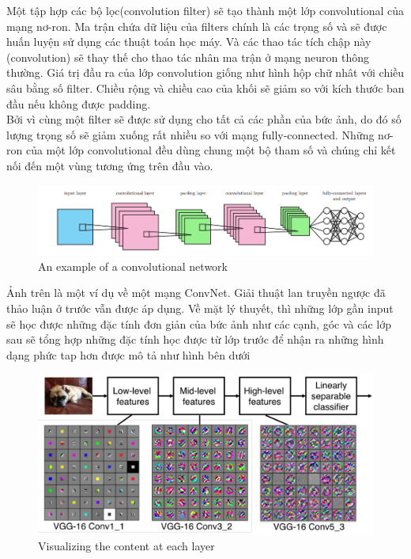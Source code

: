 Một tập hợp các bộ lọc(convolution filter) sẽ tạo thành một lớp convolutional của mạng nơ-ron. Ma trận chứa dữ liệu của filters chính là các trọng số và sẽ được huấn luyện sử dụng các thuật toán học máy. Và các thao tác tích chập này (convolution) sẽ thay thế cho thao tác nhân ma trận ở mạng neuron thông thường. Giá trị đầu ra của lớp convolution giống như hình hộp chữ nhât với chiều sâu bằng số filter. Chiều rộng và chiều cao của khối sẽ giảm so với kích thước ban đầu nếu không được padding.\\

Bởi vì cùng một filter sẽ được sử dụng cho tất cả các phần của bức ảnh, do đó số lượng trọng số sẽ giảm xuống rất nhiều so với mạng fully-connected. Những nơ-ron của một lớp convolutional đều dùng chung một bộ tham số và chúng chỉ kết nối đến một vùng tương ứng trên đầu vào.

\begin{center}
    \begin{figure}[H]
    \begin{center}
     \includegraphics[scale=.5]{image/CNNexample.PNG}
    \end{center}
    \caption{An example of a convolutional network}
    \label{fig:cnn}
    \end{figure}
\end{center}

Ảnh trên là một ví dụ về một mạng ConvNet. Giải thuật lan truyền ngược đã  thảo luận ở trước vẫn được áp dụng. Về mặt lý thuyết, thì những lớp gần input sẽ học được những đặc tính đơn giản của bức ảnh như các cạnh, góc và các lớp sau sẽ tổng hợp những đặc tính học được từ lớp trước để nhận ra những hình dạng phức tap hơn được mô tả như hình bên dưới

\begin{center}
    \begin{figure}[H]
    \begin{center}
     \includegraphics[scale=.5]{image/featureLearning.PNG}
    \end{center}
    \caption{Visualizing the content at each layer}
    \label{fig:visualize_cnn}
    \end{figure}
\end{center}


